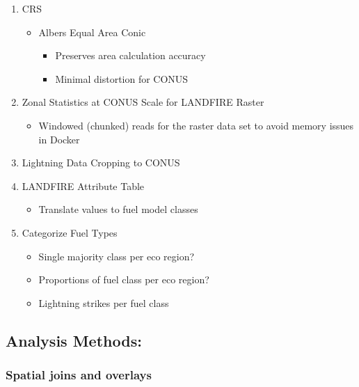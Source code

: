 \documentclass[11pt]{article}
\providecommand{\tightlist}{%
      \setlength{\itemsep}{0pt}\setlength{\parskip}{0pt}}
\begin{document}
\begin{enumerate}
\def\labelenumi{\arabic{enumi}.}
\tightlist
\item
  CRS

  \begin{itemize}
  \tightlist
  \item
    Albers Equal Area Conic

    \begin{itemize}
    \tightlist
    \item
      Preserves area calculation accuracy
    \item
      Minimal distortion for CONUS
    \end{itemize}
  \end{itemize}
\item
  Zonal Statistics at CONUS Scale for LANDFIRE Raster

  \begin{itemize}
  \tightlist
  \item
    Windowed (chunked) reads for the raster data set to avoid memory
    issues in Docker
  \end{itemize}
\item
  Lightning Data Cropping to CONUS
\item
  LANDFIRE Attribute Table

  \begin{itemize}
  \tightlist
  \item
    Translate values to fuel model classes
  \end{itemize}
\item
  Categorize Fuel Types

  \begin{itemize}
  \tightlist
  \item
    Single majority class per eco region?
  \item
    Proportions of fuel class per eco region?
  \item
    Lightning strikes per fuel class
  \end{itemize}
\end{enumerate}

    \hypertarget{analysis-methods}{%
\subsection{Analysis Methods:}\label{analysis-methods}}

\hypertarget{spatial-joins-and-overlays}{%
\subsubsection{Spatial joins and
overlays}\label{spatial-joins-and-overlays}}
\end{document}
